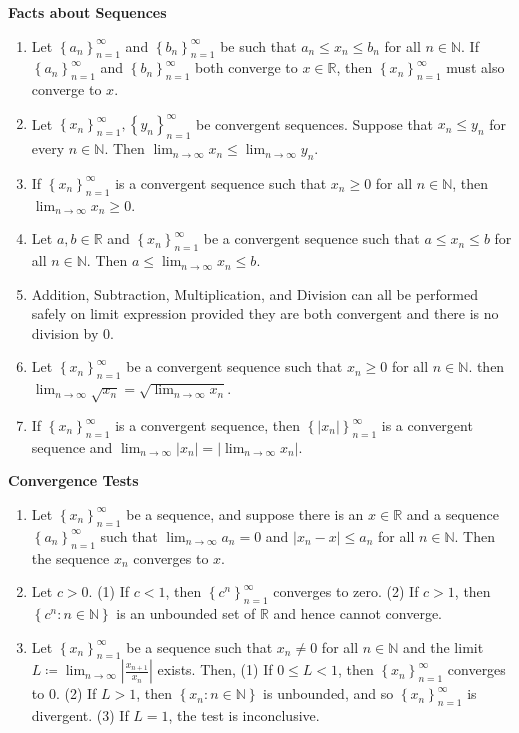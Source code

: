 \documentclass[12pt]{article}
\newcommand{\set}[1]{\left\{ {#1} \right\}}
\newcommand{\limtoinf}[1][n]{\displaystyle\lim_{ {#1} \to \infty}}
\newcommand{\abs}[1]{\left| {#1} \right|}
\newcommand{\seq}[2][n]{\left\{ {#2} \right\}_{#1=1}^\infty}
\newcommand{\bR}{\mathbb{R}}
\newcommand{\bN}{\mathbb{N}}
\begin{document}
\pagestyle{fancy}
\setlength{\headheight}{14.49998pt}
\fancyfoot[C]{\thepage}

\noindent \textbf{Facts about Sequences}

\begin{enumerate}
	\item Let $\seq{a_n}$ and $\seq{b_n}$ be such that $a_n\le x_n\le b_n$ for all $n\in\bN$. If $\seq{a_n}$ and $\seq{b_n}$ both converge to $x\in\bR$, then $\seq{x_n}$ must also converge to $x$.
	\item Let $\seq{x_n}, \seq{y_n}$ be convergent sequences. Suppose that $x_n\le y_n$ for every $n\in\bN$. Then $\limtoinf x_n \le \limtoinf y_n$.
	\item If $\seq{x_n}$ is a convergent sequence such that $x_n\ge0$ for all $n\in\bN$, then $\limtoinf x_n\ge0$.
	\item Let $a,b\in\bR$ and $\seq{x_n}$ be a convergent sequence such that $a\le x_n\le b$ for all $n\in\bN$. Then $a\le \limtoinf x_n\le b$.
	\item Addition, Subtraction, Multiplication, and Division can all be performed safely on limit expression provided they are both convergent and there is no division by 0.
	\item Let $\seq{x_n}$ be a convergent sequence such that $x_n\ge 0$ for all $n\in\bN$. then $\limtoinf \sqrt{x_n}=\sqrt{\limtoinf x_n}$.
	\item If $\seq{x_n}$ is a convergent sequence, then $\seq{\abs{x_n}}$ is a convergent sequence and $\limtoinf\abs{x_n}=\abs{\limtoinf x_n}$.
\end{enumerate}

\noindent \textbf{Convergence Tests}

\begin{enumerate}
	\item Let $\seq{x_n}$ be a sequence, and suppose there is an $x\in\bR$ and a sequence $\seq{a_n}$ such that $\limtoinf a_n =0$ and $\abs{x_n-x}\le a_n$ for all $n\in\bN$. Then the sequence $x_n$ converges to $x$.
	\item Let $c>0$. (1) If $c<1$, then $\seq{c^n}$ converges to zero. (2) If $c>1$, then $\set{c^n : n\in\bN}$ is an unbounded set of $\bR$ and hence cannot converge.
	\item Let $\seq{x_n}$ be a sequence such that $x_n\neq 0$ for all $n\in\bN$ and the limit $L\coloneq\limtoinf\abs{\frac{x_{n+1}}{x_n}}$ exists. Then, (1) If $0\le L<1$, then $\seq{x_n}$ converges to 0. (2) If $L>1$, then $\set{x_n : n\in\bN}$ is unbounded, and so $\seq{x_n}$ is divergent. (3) If $L=1$, the test is inconclusive.
\end{enumerate}
\end{document}
